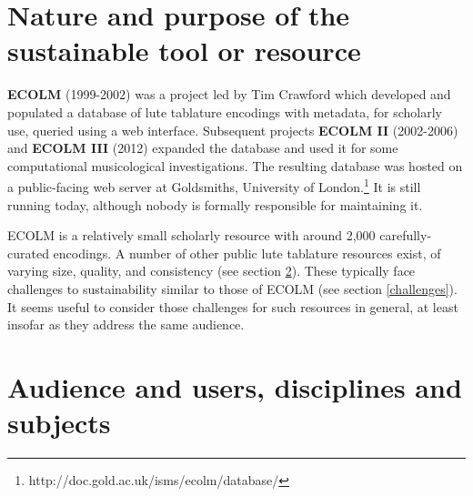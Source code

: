 \documentclass[sigconf]{acmart}
\begin{document}
\maketitle
\begin{sloppypar}


  \section{Nature and purpose of the sustainable tool or resource}

  {\bf ECOLM} (1999-2002) was a project led by Tim Crawford which
  developed and populated a database of lute tablature encodings with
  metadata, for scholarly use, queried using a web
  interface. Subsequent projects {\bf ECOLM II} (2002-2006) and {\bf
    ECOLM III} (2012) expanded the database and used it for some
  computational musicological investigations. The resulting database
  was hosted on a public-facing web server at Goldsmiths, University
  of London.\footnote{http://doc.gold.ac.uk/isms/ecolm/database/} It
  is still running today, although nobody is formally responsible for
  maintaining it.

  ECOLM is a relatively small scholarly resource with around 2,000
  carefully-curated encodings. A number of other public lute tablature
  resources exist, of varying size, quality, and consistency (see
  section \ref{audience}). These typically face challenges to
  sustainability similar to those of ECOLM (see section
  \ref{challenges}). It seems useful to consider those challenges for
  such resources in general, at least insofar as they address the same
  audience.
  
  \section{Audience and users, disciplines and subjects}\label{audience}


\end{sloppypar}
\end{document}
